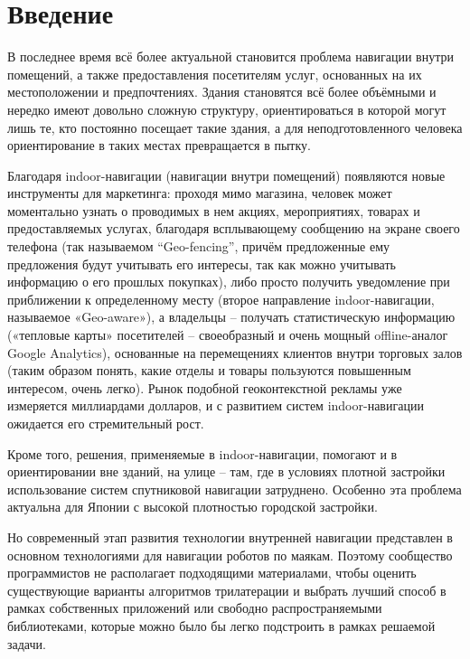 \section*{Введение}
В последнее время всё более актуальной становится проблема навигации внутри помещений, а также предоставления посетителям услуг, основанных на их местоположении и предпочтениях. Здания становятся всё более объёмными и нередко имеют довольно сложную структуру, ориентироваться в которой могут лишь те, кто постоянно посещает такие здания, а для неподготовленного человека ориентирование в таких местах превращается в пытку.

Благодаря indoor-навигации (навигации внутри помещений) появляются новые инструменты для маркетинга: проходя мимо магазина, человек может моментально узнать о проводимых в нем акциях, мероприятиях, товарах и предоставляемых услугах, благодаря всплывающему сообщению на экране своего телефона (так называемом “Geo-fencing”, причём предложенные ему предложения будут учитывать его интересы, так как можно учитывать информацию о его прошлых покупках), либо просто получить уведомление при приближении к определенному месту (второе направление indoor-навигации, называемое «Geo-aware»), а владельцы – получать статистическую информацию («тепловые карты» посетителей – своеобразный и очень мощный offline-аналог Google Analytics), основанные на перемещениях клиентов внутри торговых залов (таким образом понять, какие отделы и товары пользуются повышенным интересом, очень легко). Рынок подобной геоконтекстной рекламы уже измеряется миллиардами долларов, и с развитием систем indoor-навигации ожидается его стремительный рост.

Кроме того, решения, применяемые в indoor-навигации, помогают и в ориентировании вне зданий, на улице – там, где в условиях плотной застройки использование систем спутниковой навигации затруднено. Особенно эта проблема актуальна для Японии с высокой плотностью городской застройки.

Но современный этап развития технологии внутренней навигации представлен в основном технологиями для навигации роботов по маякам. Поэтому сообщество программистов не располагает подходящими материалами, чтобы оценить существующие варианты алгоритмов трилатерации и выбрать лучший способ в рамках собственных приложений или свободно распространяемыми библиотеками, которые можно было бы легко подстроить в рамках решаемой задачи.